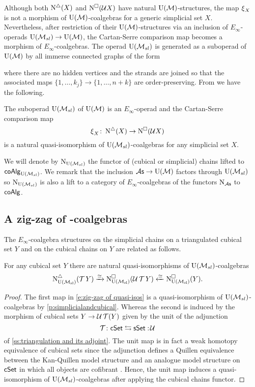 Although both $\operatorname{N^{\triangle}}(X)$ and $\operatorname{N^{\square}}(\mathcal{U} X)$ have natural ${\operatorname{U}(\mathcal{M})}$-structures, the map $\operatorname{\xi}_X$ is not a morphism of ${\operatorname{U}(\mathcal{M})}$-coalgebras for a generic simplicial set $X$.
Nevertheless, after restriction of their ${\operatorname{U}(\mathcal{M})}$-structures via an inclusion of $E_\infty$-operads ${\operatorname{U}(\mathcal{M}_{sl})} \to {\operatorname{U}(\mathcal{M})}$, the Cartan-Serre comparison map becomes a morphism of $E_\infty$-coalgebras.
The operad ${\operatorname{U}(\mathcal{M}_{sl})}$ is generated as a suboperad of ${\operatorname{U}(\mathcal{M})}$ by all immerse connected graphs of the form

where there are no hidden vertices and the strands are joined so that the associated maps $\{1, \dots, k_j\} \to \{1, \dots, n+k\}$ are order-preserving.
From \cite{medina2021cubical} we have the following.

\begin{proposition} \label{p:simplicialandcubical}
	The suboperad ${\operatorname{U}(\mathcal{M}_{sl})}$ of ${\operatorname{U}(\mathcal{M})}$ is an $E_\infty$-operad and the Cartan-Serre comparison map
	\[
	\operatorname{\xi}_X \colon \operatorname{N^{\triangle}}(X) \to \operatorname{N^{\square}}(\mathcal U X)
	\]
	is a natural quasi-isomorphism of ${\operatorname{U}(\mathcal{M}_{sl})}$-coalgebras for any simplicial set $X$.
\end{proposition}

We will denote by $\operatorname{N}_{\operatorname{U}(\mathcal{M}_{sl})}$ the functor of (cubical or simplicial) chains lifted to $\mathsf{coAlg}_{\operatorname{U}(\mathcal{M}_{sl})}$.
We remark that the inclusion ${\mathcal{A}\mathsf{s}} \to {\operatorname{U}(\mathcal{M})}$ factors through ${\operatorname{U}(\mathcal{M}_{sl})}$ so $\operatorname{N}_{\operatorname{U}(\mathcal{M}_{sl})}$ is also a lift to a category of $E_\infty$-coalgebras of the functors $\operatorname{N}_{\mathcal{A}\mathsf{s}}$ to $\mathsf{coAlg}$.

\subsection{A zig-zag of \pdfEinfty-coalgebras}
The $E_{\infty}$-coalgebra structures on the simplicial chains on a triangulated cubical set $Y$ and on the cubical chains on $Y$ are related as follows.

\begin{lemma} \label{l:zigzag}
	For any cubical set $Y$ there are natural quasi-isomorphisms of ${\operatorname{U}(\mathcal{M}_{sl})}$-coalgebras
	\begin{equation} \label{e:zig-zag of quasi-isos}
	\operatorname{N^{\triangle}_{{\operatorname{U}(\mathcal{M}_{sl})}}}(\operatorname{\mathcal{T}} Y) \xrightarrow{\simeq}
	\operatorname{N^{\square}_{{\operatorname{U}(\mathcal{M}_{sl})}}}(\mathcal{U}\operatorname{\mathcal{T}} Y) \xleftarrow{\simeq}
	\operatorname{N^{\square}_{{\operatorname{U}(\mathcal{M}_{sl})}}}(Y).
	\end{equation}
\end{lemma}

\begin{proof}
	The first map in \eqref{e:zig-zag of quasi-isos} is a quasi-isomorphism of ${\operatorname{U}(\mathcal{M}_{sl})}$-coalgebras by \cref{p:simplicialandcubical}.
	Whereas the second is induced by the morphism of cubical sets $Y \to \mathcal{U} \operatorname{\mathcal{T}} (Y)$ given by the unit of the adjunction
	\[
	\operatorname{\mathcal{T}} \colon \mathsf{cSet} \leftrightarrows \mathsf{sSet} :\! \mathcal{U}
	\]
	of \cref{ss:triangulation and its adjoint}.
	The unit map is in fact a weak homotopy equivalence of cubical sets since the adjunction defines a Quillen equivalence between the Kan-Quillen model structure and an analogue model structure on $\mathsf{cSet}$ in which all objects are cofibrant \cite{cisinski2006presheaves}.
	Hence, the unit map induces a quasi-isomorphism of ${\operatorname{U}(\mathcal{M}_{sl})}$-coalgebras after applying the cubical chains functor.
\end{proof}

